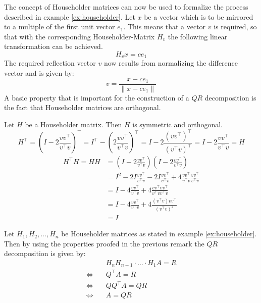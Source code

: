 The concept of Householder matrices can now be used to formalize the process described in example \ref{ex:householder}. Let $x$ be a vector which is to be mirrored to a multiple of the first unit vector $e_1$. This means that a vector $v$ is required, so that with the corresponding Householder-Matrix $H_v$ the following linear transformation can be achieved.
\begin{equation*}
	H_{v} x = c e_1
\end{equation*}
The required reflection vector $v$ now results from normalizing the difference vector and is given by:
\begin{equation*}
	v = \frac{x - ce_1}{\lVert x - ce_1\rVert}
\end{equation*}
A basic property that is important for the construction of a $QR$ decomposition is the fact that Householder matrices are orthogonal. 
\begin{remark}
	Let $H$ be a Householder matrix. Then $H$ is symmetric and orthogonal.	
	\begin{equation*}
		H^\top 	= (I - 2 \frac{v v^\top}{v^\top v})^\top 
				= I^\top - \left( 2 \frac{v v^\top}{v^\top v} \right)^\top 
				= I - 2 \frac{\left( v v^\top \right)^\top}{\left( v^\top v \right)^\top} 
				= I - 2 \frac{v v^\top}{v^\top v} = H	
	\end{equation*}	
	\begin{align*}
		H^\top H = H H 	
		& = (I - 2 \frac{v v^\top}{v^\top v}) (I - 2 \frac{v v^\top}{v^\top v}) \\
		& = I^2 - 2I \frac{v v^\top}{v^\top v} - 2I \frac{v v^\top}{v^\top v} + 4 \frac{v v^\top}{v^\top v} \frac{v v^\top}{v^\top v} \\
		& = I - 4 \frac{v v^\top}{v^\top v} + 4 \frac{v v^\top v v^\top}{v^\top v v^\top v} \\
		& = I - 4 \frac{v v^\top}{v^\top v} + 4 \frac{(v^\top v) v v^\top}{(v^\top v)^2} \\
		& = I
	\end{align*}	
\end{remark}


\begin{remark}
	Let $H_1, H_2, ..., H_n$ be Householder matrices as stated in example \ref{ex:householder}. Then by using the properties proofed in the previous remark the $QR$ decomposition is given by:  
	\begin{align*}
							  & H_n H_{n-1} \cdot \ldots \cdot H_1   A = R   \\
		\Leftrightarrow \quad & Q^\top A = R \\
		\Leftrightarrow \quad & QQ^\top A = QR \\
		\Leftrightarrow \quad & A = QR \\
	\end{align*}
\end{remark}

